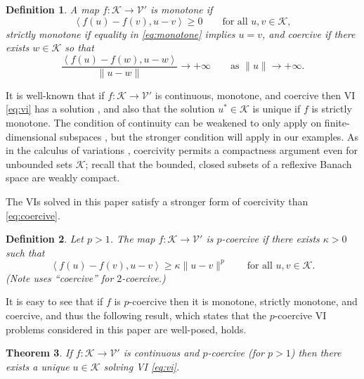 \documentclass[letterpaper,final,12pt,reqno]{amsart}
\theoremstyle{cstyle}
\newtheorem{theorem}{Theorem}
\theoremstyle{cstyle*}
\theoremstyle{dstyle}
\newtheorem{definition}[theorem]{Definition}
\numberwithin{equation}{section}
\numberwithin{figure}{section}
\numberwithin{table}{section}
\numberwithin{theorem}{section}
\newcommand{\cK}{\mathcal{K}}
\newcommand{\cV}{\mathcal{V}}
\newcommand{\ip}[2]{\left<#1,#2\right>}
\begin{document}
\begin{definition} A map $f:\cK \to \cV'$ is \emph{monotone} if
\begin{equation}
\ip{f(u)-f(v)}{u-v} \ge 0 \qquad \text{for all } u,v \in \cK, \label{eq:monotone}
\end{equation}
\emph{strictly monotone} if equality in \eqref{eq:monotone} implies $u=v$, and \emph{coercive} if there exists $w \in \cK$ so that
\begin{equation}
\frac{\ip{f(u)-f(w)}{u-w}}{\|u-w\|} \to +\infty \qquad \text{as } \|u\|\to +\infty. \label{eq:coercive}
\end{equation}
\end{definition}

It is well-known that if $f:\cK \to \cV'$ is continuous, monotone, and coercive then VI \eqref{eq:vi} has a solution \cite[Corollary III.1.8]{KinderlehrerStampacchia1980}, and also that the solution $u^* \in \cK$ is unique if $f$ is strictly monotone.  The condition of continuity can be weakened to only apply on finite-dimensional subspaces \cite{KinderlehrerStampacchia1980}, but the stronger condition will apply in our examples.  As in the calculus of variations \cite{Evans2010}, coercivity permits a compactness argument even for unbounded sets $\cK$; recall that the bounded, closed subsets of a reflexive Banach space are weakly compact.

The VIs solved in this paper satisfy a stronger form of coercivity than \eqref{eq:coercive}.

\begin{definition}  Let $p>1$.  The map $f:\cK \to \cV'$ is \emph{$p$-coercive} if there exists $\kappa>0$ such that
\begin{equation}
\ip{f(u)-f(v)}{u-v} \ge \kappa \|u-v\|^p \qquad \text{for all } u,v \in \cK. \label{eq:pcoercive}
\end{equation}
(Note \cite{Tai2003} uses ``coercive'' for $2$-coercive.)
\end{definition}

It is easy to see that if $f$ is $p$-coercive then it is monotone, strictly monotone, and coercive, and thus the following result, which states that the $p$-coercive VI problems considered in this paper are well-posed, holds.

\begin{theorem}  \label{thm:viwellposed}  If $f:\cK \to \cV'$ is continuous and $p$-coercive (for $p>1$) then there exists a unique $u\in \cK$ solving VI \eqref{eq:vi}.
\end{theorem}
\end{document}
